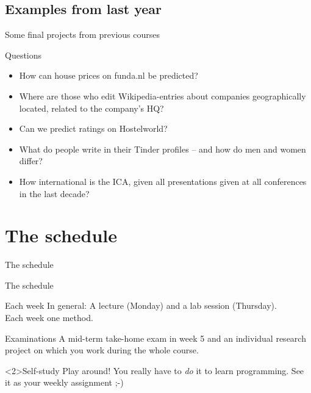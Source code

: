 \subsection{Examples from last year}
\begin{frame}{Some final projects from previous courses}
\begin{block}{Questions}
\begin{itemize}
\item How can house prices on funda.nl be predicted?
\item Where are those who edit Wikipedia-entries about companies geographically located, related to the company's HQ?
\item Can we predict ratings on Hostelworld?
\item What do people write in their Tinder profiles -- and how do men and women differ?
\item How international is the ICA, given all presentations given at all conferences in the last decade?
\end{itemize}
\end{block}

\end{frame}


\section{The schedule}
\begin{frame}
The schedule
\end{frame}

\begin{frame}{The schedule}
\begin{block}{Each week}
In general: A lecture (Monday) and a lab session (Thursday). \\ Each week one method.
\end{block}
\begin{block}{Examinations}
A mid-term take-home exam in week 5 and an individual research project on which you work during the whole course.
\end{block}


\begin{alertblock}<2>{Self-study}
Play around! You really have to \emph{do} it to learn programming. See it as your weekly assignment ;-)
\end{alertblock}
\end{frame}


